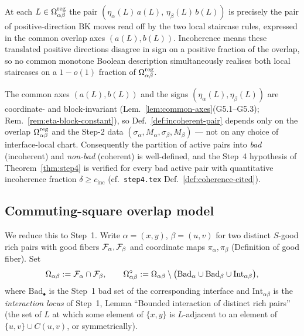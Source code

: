 \begin{remark}
At each $L\in\Omega^{\mathrm{reg}}_{\alpha\beta}$ the pair
$(\eta_\alpha(L)\,a(L),\,\eta_\beta(L)\,b(L))$ is precisely the pair of
positive-direction BK moves read off by the two local staircase rules,
expressed in the common overlap axes $(a(L),b(L))$.  Incoherence means
these translated positive directions disagree in sign on a positive
fraction of the overlap, so no common monotone Boolean description
simultaneously realises both local staircases on a $1-o(1)$ fraction of
$\Omega^{\mathrm{reg}}_{\alpha\beta}$.
\end{remark}

\begin{remark}
The common axes $(a(L),b(L))$ and the signs
$(\eta_\alpha(L),\eta_\beta(L))$ are coordinate- and block-invariant
(Lem.~\ref{lem:common-axes}(G5.1--G5.3);
Rem.~\ref{rem:eta-block-constant}), so
Def.~\ref{def:incoherent-pair} depends only on the overlap
$\Omega^{\mathrm{reg}}_{\alpha\beta}$ and the Step-2 data
$(\sigma_\alpha,M_\alpha,\sigma_\beta,M_\beta)$ --- not on any choice of
interface-local chart.  Consequently the partition of active pairs into
\emph{bad} (incoherent) and \emph{non-bad} (coherent) is well-defined,
and the Step~4 hypothesis of Theorem~\ref{thm:step4} is verified for
every bad active pair with quantitative incoherence fraction
$\delta\ge c_{\mathrm{inc}}$ (cf.\ \texttt{step4.tex}
Def.~\ref{def:coherence-cited}).
\end{remark}

\subsection{Commuting-square overlap model}\label{sec:gap-commuting}

We reduce this to Step~1.  Write
$\alpha=(x,y)$, $\beta=(u,v)$ for two distinct $S$-good rich pairs
with good fibers $\mathcal{F}_{\alpha},\mathcal{F}_{\beta}$ and coordinate maps
$\pi_\alpha,\pi_\beta$ (Definition of good fiber).
Set
\[
  \Omega_{\alpha\beta} := \mathcal{F}_{\alpha}\cap\mathcal{F}_{\beta},
  \qquad
  \Omega^{\circ}_{\alpha\beta}
    := \Omega_{\alpha\beta}
       \setminus\bigl(\mathrm{Bad}_\alpha\cup\mathrm{Bad}_\beta
                      \cup\mathrm{Int}_{\alpha\beta}\bigr),
\]
where $\mathrm{Bad}_\bullet$ is the Step~1 bad set of the
corresponding interface and $\mathrm{Int}_{\alpha\beta}$ is the
\emph{interaction locus} of Step~1, Lemma ``Bounded interaction of
distinct rich pairs'' (the set of $L$ at which some element of
$\{x,y\}$ is $L$-adjacent to an element of $\{u,v\}\cup C(u,v)$, or
symmetrically).


